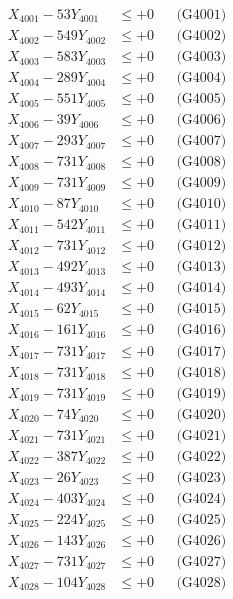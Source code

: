 \documentclass[a4paper,10pt]{article}
\begin{document}
{\begin{align}
\allowbreak
X_{4001} - 53Y_{4001} &\leq +0 && \text{(G4001)} \\
X_{4002} - 549Y_{4002} &\leq +0 && \text{(G4002)} \\
X_{4003} - 583Y_{4003} &\leq +0 && \text{(G4003)} \\
X_{4004} - 289Y_{4004} &\leq +0 && \text{(G4004)} \\
X_{4005} - 551Y_{4005} &\leq +0 && \text{(G4005)} \\
X_{4006} - 39Y_{4006} &\leq +0 && \text{(G4006)} \\
X_{4007} - 293Y_{4007} &\leq +0 && \text{(G4007)} \\
X_{4008} - 731Y_{4008} &\leq +0 && \text{(G4008)} \\
X_{4009} - 731Y_{4009} &\leq +0 && \text{(G4009)} \\
X_{4010} - 87Y_{4010} &\leq +0 && \text{(G4010)} \\
\allowbreak
X_{4011} - 542Y_{4011} &\leq +0 && \text{(G4011)} \\
X_{4012} - 731Y_{4012} &\leq +0 && \text{(G4012)} \\
X_{4013} - 492Y_{4013} &\leq +0 && \text{(G4013)} \\
X_{4014} - 493Y_{4014} &\leq +0 && \text{(G4014)} \\
X_{4015} - 62Y_{4015} &\leq +0 && \text{(G4015)} \\
X_{4016} - 161Y_{4016} &\leq +0 && \text{(G4016)} \\
X_{4017} - 731Y_{4017} &\leq +0 && \text{(G4017)} \\
X_{4018} - 731Y_{4018} &\leq +0 && \text{(G4018)} \\
X_{4019} - 731Y_{4019} &\leq +0 && \text{(G4019)} \\
X_{4020} - 74Y_{4020} &\leq +0 && \text{(G4020)} \\
\allowbreak
X_{4021} - 731Y_{4021} &\leq +0 && \text{(G4021)} \\
X_{4022} - 387Y_{4022} &\leq +0 && \text{(G4022)} \\
X_{4023} - 26Y_{4023} &\leq +0 && \text{(G4023)} \\
X_{4024} - 403Y_{4024} &\leq +0 && \text{(G4024)} \\
X_{4025} - 224Y_{4025} &\leq +0 && \text{(G4025)} \\
X_{4026} - 143Y_{4026} &\leq +0 && \text{(G4026)} \\
X_{4027} - 731Y_{4027} &\leq +0 && \text{(G4027)} \\
X_{4028} - 104Y_{4028} &\leq +0 && \text{(G4028)} \\

\end{align}}
\end{document}
